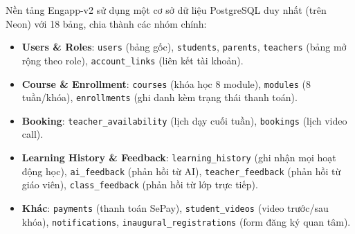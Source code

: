Nền tảng Engapp-v2 sử dụng một cơ sở dữ liệu PostgreSQL duy nhất (trên Neon) với 18 bảng, chia thành các nhóm chính:
\begin{itemize}
    \item \textbf{Users \& Roles}: \texttt{users} (bảng gốc), \texttt{students}, \texttt{parents}, \texttt{teachers} (bảng mở rộng theo role), \texttt{account\_links} (liên kết tài khoản).
    \item \textbf{Course \& Enrollment}: \texttt{courses} (khóa học 8 module), \texttt{modules} (8 tuần/khóa), \texttt{enrollments} (ghi danh kèm trạng thái thanh toán).
    \item \textbf{Booking}: \texttt{teacher\_availability} (lịch dạy cuối tuần), \texttt{bookings} (lịch video call).
    \item \textbf{Learning History \& Feedback}: \texttt{learning\_history} (ghi nhận mọi hoạt động học), \texttt{ai\_feedback} (phản hồi từ AI), \texttt{teacher\_feedback} (phản hồi từ giáo viên), \texttt{class\_feedback} (phản hồi từ lớp trực tiếp).
    \item \textbf{Khác}: \texttt{payments} (thanh toán SePay), \texttt{student\_videos} (video trước/sau khóa), \texttt{notifications}, \texttt{inaugural\_registrations} (form đăng ký quan tâm).
\end{itemize}
